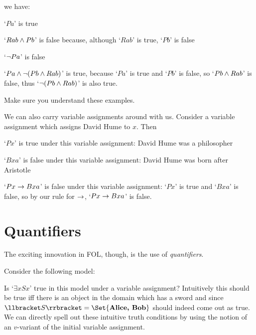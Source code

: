 we have:
\begin{compactlist}
	\item[\textbullet] `$Pa$' is true
	\item[\textbullet] `$Rab \mathbin{\wedge} Pb$' is false because, although `$Rab$' is true, `$Pb$' is false
	\item[\textbullet] `$\neg Pa$' is false
	\item[\textbullet] `$Pa \mathbin{\wedge} \neg(Pb\mathbin{\wedge} Rab)$' is true, because `$Pa$' is true and `$Pb$' is false, so `$Pb\mathbin{\wedge} Rab$' is false, thus `$\neg (Pb\mathbin{\wedge} Rab)$' is also true.
\end{compactlist}
Make sure you understand these examples.

We can also carry variable assignments around with us. Consider a variable assignment which assigns David Hume to $x$. Then \begin{ebullet}
	\item `$Px$' is true under this variable assignment: David Hume was a philosopher
	\item `$Bxa$' is false under this variable assignment: David Hume was born after Aristotle
	\item `$Px\rightarrow Bxa$' is false under this variable assignment: `$Px$' is true and `$Bxa$' is false, so by our rule for $\rightarrow$, `$Px\rightarrow Bxa$' is false.
\end{ebullet}


\section{Quantifiers}

The exciting innovation in FOL, though, is the use of \emph{quantifiers}.

Consider the following model:
\begin{center}
	
\end{center}

\noindent Is `$\exists x Sx$' true in this model under a variable assignment? Intuitively this should be true iff there is an object in the domain which has a sword and since $\denote{S}=\Set{\text{\emph{Alice, Bob}}}$ should indeed come out as true. We can directly spell out these intuitive truth conditions by using the notion of an  $v$-variant of the initial variable assignment.


